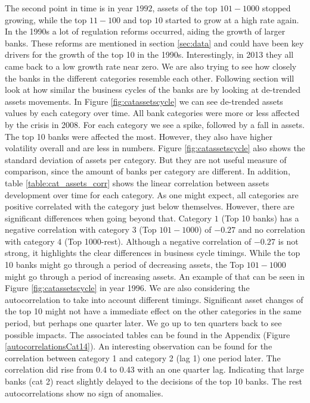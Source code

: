 \documentclass[12pt, a4paper]{article} %
\begin{document}
The second point in time is in year $1992$, assets of the top $101-1000$ stopped growing, while the top $11-100$ and top $10$ started to grow at a high rate again. In the 1990s a lot of regulation reforms occurred, aiding the growth of larger banks. These reforms are mentioned in section \ref{sec:data} and could have been key drivers for the growth of the top 10 in the 1990s. Interestingly, in 2013 they all came back to a low growth rate near zero.
\fi
We are also trying to see how closely the banks in the different categories resemble each other. Following section will look at how similar the business cycles of the banks are by looking at de-trended assets movements. 
In Figure \ref{fig:catassetscycle} we can see de-trended assets values by each category over time. All bank categories were more or less affected by the crisis in 2008. For each category we see a spike, followed by a fall in assets. The top 10 banks were affected the most. However, they also have higher volatility overall and are less in numbers. Figure \ref{fig:catassetscycle} also shows the standard deviation of assets per category. But they are not useful measure of comparison, since the amount of banks per category are different.
In addition, table \ref{table:cat_assets_corr} shows the linear correlation between assets development over time for each category. As one might expect, all categories are positive correlated with the category just below themselves. However, there are significant differences when going beyond that. Category $1$ (Top 10 banks) has a negative correlation with category $3$ (Top $101-1000$) of $-0.27$ and no correlation with category $4$ (Top 1000-rest). Although a negative correlation of $-0.27$ is not strong, it highlights the clear differences in business cycle timings. While the top 10 banks might go through a period of decreasing assets, the Top $101-1000$ might go through a period of increasing assets. An example of that can be seen in Figure \ref{fig:catassetscycle} in year 1996. 
We are also considering the autocorrelation to take into account different timings. Significant asset changes of the top 10 might not have a immediate effect on the other categories in the same period, but perhaps one quarter later. We go up to ten quarters back to see possible impacts. The associated tables can be found in the Appendix (Figure \ref{autocorrelationsCat14}). An interesting observation can be found for the correlation between category 1 and category 2 (lag 1) one period later. The correlation did rise from 0.4 to 0.43 with an one quarter lag. Indicating that large banks (cat 2) react slightly delayed to the decisions of the top 10 banks. The rest autocorrelations show no sign of anomalies. 
\end{document}

